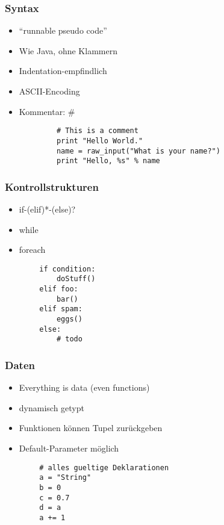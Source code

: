 \documentclass[handout]{beamer}
\begin{document}
\begin{frame}[fragile]
	\frametitle{Syntax}
	\begin{itemize}
		\item ``runnable pseudo code''
		\item Wie Java, ohne Klammern
		\item Indentation-empfindlich
		\item ASCII-Encoding
		\item Kommentar: \#
	\end{itemize}
		\begin{lstlisting}
			# This is a comment
			print "Hello World."
			name = raw_input("What is your name?")
			print "Hello, %s" % name
		\end{lstlisting}
\end{frame}


\begin{frame}[fragile]
	\frametitle{Kontrollstrukturen}
	\begin{itemize}
		\item if-(elif)*-(else)?
		\item while
		\item foreach
	\end{itemize}
	\begin{lstlisting}
		if condition:
    		doStuff()
		elif foo:
		    bar()
		elif spam:
		    eggs()
		else:
		    # todo
	\end{lstlisting}
\end{frame}

\begin{frame}[fragile]
	\frametitle{Daten}
	\begin{itemize}
		\item Everything is data (even functions)
		\item dynamisch getypt
		\item Funktionen können Tupel zurückgeben
		\item Default-Parameter möglich
	\end{itemize}
	\begin{lstlisting}
		# alles gueltige Deklarationen
		a = "String"
		b = 0
		c = 0.7
		d = a
		a += 1
	\end{lstlisting}
\end{frame}

\end{document}
